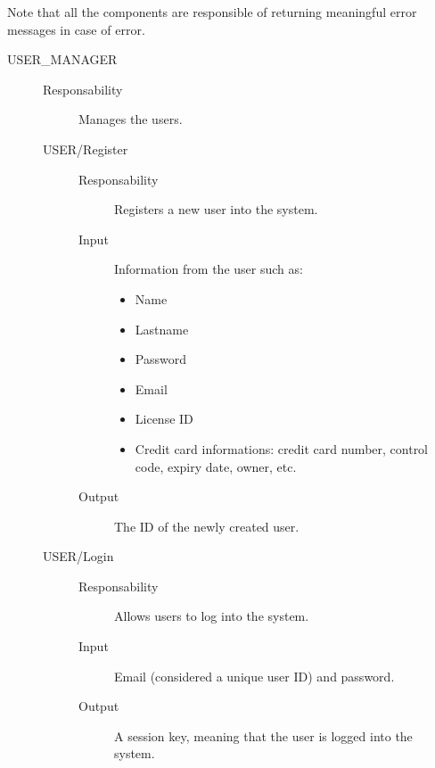 \documentclass[11pt]{article} %
\begin{document}
Note that all the components are responsible of returning meaningful error messages in case of error.

\begin{description}
	\item[USER\_MANAGER] \hfill
	\begin{description}
		\item[Responsability] Manages the users.
	\item[USER/Register] \hfill
		\begin{description}
			\item[Responsability] Registers a new user into the system.
			\item[Input] Information from the user such as:
				\begin{itemize}
					\item Name
					\item Lastname
					\item Password
					\item Email
					\item License ID
					\item Credit card informations: credit card number, control code, expiry date, owner, etc.
				\end{itemize}
			\item[Output] The ID of the newly created user.
		\end{description}
	\item[USER/Login] \hfill
		\begin{description}
			\item[Responsability] Allows users to log into the system.
			\item[Input] Email (considered a unique user ID) and password.
			\item[Output] A session key, meaning that the user is logged into the system.
		\end{description}
	\end{description}
	

\end{description}
\end{document}
